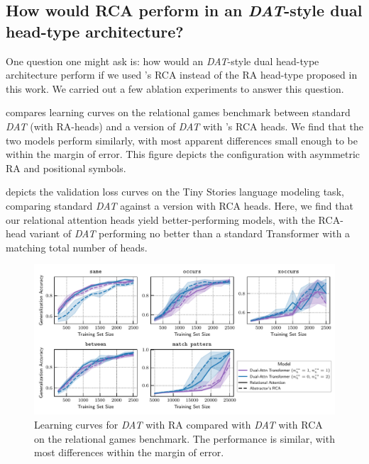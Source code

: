 \subsection{How would RCA perform in an \textit{DAT}-style dual head-type architecture?}

One question one might ask is: how would an \textit{DAT}-style dual head-type architecture perform if we used \citet{altabaa2024abstractors}'s RCA instead of the RA head-type proposed in this work. We carried out a few ablation experiments to answer this question.

 compares learning curves on the relational games benchmark between standard \textit{DAT} (with RA-heads) and a version of \textit{DAT} with \citet{altabaa2024abstractors}'s RCA heads. We find that the two models perform similarly, with most apparent differences small enough to be within the margin of error. This figure depicts the configuration with asymmetric RA and positional symbols.

 depicts the validation loss curves on the Tiny Stories language modeling task, comparing standard \textit{DAT} against a version with RCA heads. Here, we find that our relational attention heads yield better-performing models, with the RCA-head variant of \textit{DAT} performing no better than a standard Transformer with a matching total number of heads.

\begin{figure}[ht]
    \includegraphics[width=\textwidth]{figs/experiments/relgames/relgames_learning_curves_rcatype_ablation.pdf}
    \caption{Learning curves for \textit{DAT} with RA compared with \textit{DAT} with RCA on the relational games benchmark. The performance is similar, with most differences within the margin of error.}\label{fig:relgames_ratype_ablation}
\end{figure}

